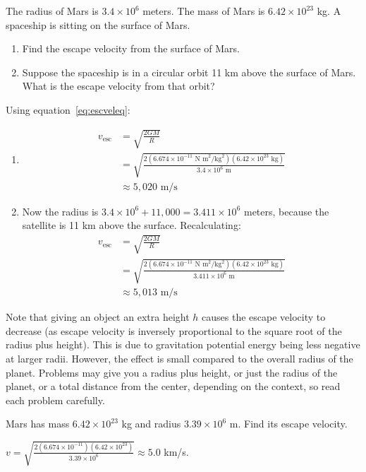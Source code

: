 \begin{Exercise}[title={Escape Velocity from Mars}, label=escape_mars]
  
  The radius of Mars is $3.4 \times 10^6$ meters. The mass of Mars is
  $6.42 \times 10^{23}$ kg. A spaceship is sitting on the surface of Mars.


  \begin{enumerate}
    \item Find the escape velocity from the surface of Mars.
    \item Suppose the spaceship is in a circular orbit 11 km above the surface of Mars. What is the escape velocity from that orbit?
  \end{enumerate}
\end{Exercise}
\begin{Answer}[ref=escape_mars]
Using equation~\ref{eq:escveleq}:
\begin{enumerate}
  \item 
  \begin{align*}
      v_{\text{esc}} &= \sqrt{\frac{2GM}{R}} \\
      &= \sqrt{\frac{2(6.674 \times 10^{-11} \text{ N m}^2/\text{kg}^2)(6.42 \times 10^{23} \text{ kg})}{3.4 \times 10^6 \text{ m}}} \\
      &\approx 5,020 \text{ m/s} 
\end{align*}
\item 
Now the radius is $3.4 \times 10^6 + 11,000 = 3.411 \times 10^6$ meters, because the satellite is 11 km above the surface. Recalculating:
\begin{align*}
    v_{\text{esc}} &= \sqrt{\frac{2GM}{R}} \\
    &= \sqrt{\frac{2(6.674 \times 10^{-11} \text{ N m}^2/\text{kg}^2)(6.42 \times 10^{23} \text{ kg})}{3.411 \times 10^6 \text{ m}}} \\
    &\approx 5,013 \text{ m/s} 
\end{align*}
\end{enumerate}
\end{Answer}

Note that giving an object an extra height $h$ causes the escape velocity to decrease (as escape velocity is inversely proportional to the square root of the radius plus height). This is due to gravitation potential energy being less negative at larger radii. However, the effect is small compared to the overall radius of the planet. Problems may give you a radius plus height, or just the radius of the planet, or a total distance from the center, depending on the context, so read each problem carefully.

\begin{Exercise}[title={Escape from Mars}, label=orb3]
Mars has mass $6.42 \times 10^{23}$ kg and radius $3.39 \times 10^6$ m. Find its escape velocity.
\end{Exercise}
\begin{Answer}[ref=orb3]
$v = \sqrt{\frac{2(6.674 \times 10^{-11})(6.42 \times 10^{23})}{3.39 \times 10^6}} \approx 5.0$ km/s.
\end{Answer}
